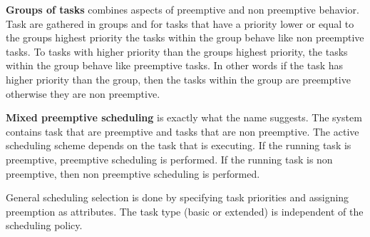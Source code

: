 \textbf{Groups of tasks} combines aspects of preemptive and non preemptive behavior. Task are gathered in groups and for tasks that have a priority lower or equal to the groups highest priority the tasks within the group behave like non preemptive tasks. To tasks with higher priority than the groups highest priority, the tasks within the group behave like preemptive tasks. In other words if the task has higher priority than the group, then the tasks within the group are preemptive otherwise they are non preemptive.

\textbf{Mixed preemptive scheduling} is exactly what the name suggests. The system contains task that are preemptive and tasks that are non preemptive. The active scheduling scheme depends on the task that is executing. If the running task is preemptive, preemptive scheduling is performed. If the running task is non preemptive, then non preemptive scheduling is performed. 

General scheduling selection is done by specifying task priorities and assigning preemption as attributes. The task type (basic or extended) is independent of the scheduling policy. 
